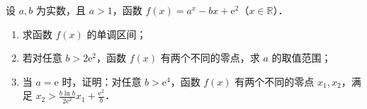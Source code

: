 \begin{description}
\begin{enumerate}[leftmargin=5pt]
        设 $a,b$ 为实数，且 $a>1$，函数 $f(x)=a^{x}-bx+\mathrm{e}^{2}$（$x\in\mathbb{R}$）．

        \begin{enumerate}[label=(\arabic*)]
            \item 求函数 $f(x)$ 的单调区间；
            \item 若对任意 $b>2\mathrm{e}^{2}$，函数 $f(x)$ 有两个不同的零点，求 $a$ 的取值范围；
            \item 当 $a=\mathrm{e}$ 时，证明：对任意 $b>\mathrm{e}^{4}$，函数 $f(x)$ 有两个不同的零点 $x_{1},x_{2}$，满足 $x_{2}>\frac{b\ln b}{2\mathrm{e}^{2}}x_{1}+\frac{\mathrm{e}^{2}}{b}$．
        \end{enumerate}
    \end{enumerate}
\end{description}
\clearpage
